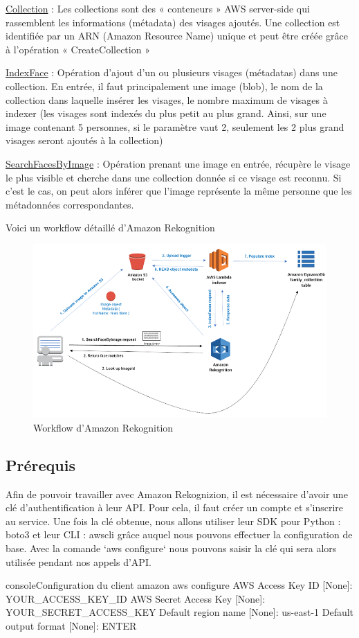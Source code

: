 \underline{Collection} : Les collections sont des « conteneurs » AWS server-side qui rassemblent les informations (métadata)
des visages ajoutés. Une collection est identifiée par un ARN (Amazon Resource Name) unique et peut être créée
grâce à l’opération « CreateCollection »

\underline{IndexFace} : Opération d’ajout d’un ou plusieurs visages (métadatas) dans une collection. En entrée, il faut
principalement une image (blob), le nom de la collection dans laquelle insérer les visages, le nombre maximum de
visages à indexer (les visages sont indexés du plus petit au plus grand. Ainsi, sur une image contenant 5 personnes,
si le paramètre vaut 2, seulement les 2 plus grand visages seront ajoutés à la collection)

\underline{SearchFacesByImage}\label{text:SearchFacesByImage} : Opération prenant une image en entrée, récupère le visage le plus visible et cherche dans
une collection donnée si ce visage est reconnu. Si c’est le cas, on peut alors inférer que l’image représente la même
personne que les métadonnées correspondantes.

Voici un workflow détaillé d’Amazon Rekognition

\begin{figure}[H]
	\centering
	\includegraphics[width=12cm]{images/proto-6.png}
	\caption{Workflow d'Amazon Rekognition}
	\label{fig:reko-workflow}
\end{figure}

\subsection{Prérequis}

Afin de pouvoir travailler avec Amazon Rekognizion, il est nécessaire d’avoir une clé d’authentification à leur API.
Pour cela, il faut créer un compte et s’inscrire au service. Une fois la clé obtenue, nous allons utiliser leur SDK pour
Python : boto3  et leur CLI : awscli grâce auquel nous pouvons effectuer la configuration de base.
Avec la comande `aws configure` nous pouvons saisir la clé qui sera alors utilisée pendant nos appels d’API.

\begin{listingsbox}{console}{Configuration du client amazon}
aws configure
AWS Access Key ID [None]:  YOUR_ACCESS_KEY_ID
AWS Secret Access Key [None]: YOUR_SECRET_ACCESS_KEY
Default region name [None]: us-east-1
Default output format [None]: ENTER
\end{listingsbox}